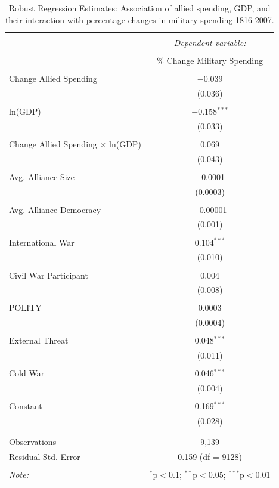 \documentclass[12pt]{article}
\begin{document}
\begin{table}[!htbp] \centering 
  \caption{} 
  \label{} 
\begin{tabular}{@{\extracolsep{5pt}}lc} 
\\[-1.8ex]\hline 
\hline \\[-1.8ex] 
 & \multicolumn{1}{c}{\textit{Dependent variable:}} \\ 
\cline{2-2} 
\\[-1.8ex] & \% Change Military Spending \\ 
\hline \\[-1.8ex] 
 Change Allied Spending & $-$0.039 \\ 
  & (0.036) \\ 
  & \\ 
 ln(GDP) & $-$0.158$^{***}$ \\ 
  & (0.033) \\ 
  & \\ 
 Change Allied Spending $\times$ ln(GDP) & 0.069 \\ 
  & (0.043) \\ 
  & \\ 
 Avg. Alliance Size & $-$0.0001 \\ 
  & (0.0003) \\ 
  & \\ 
 Avg. Alliance Democracy & $-$0.00001 \\ 
  & (0.001) \\ 
  & \\ 
 International War & 0.104$^{***}$ \\ 
  & (0.010) \\ 
  & \\ 
 Civil War Participant & 0.004 \\ 
  & (0.008) \\ 
  & \\ 
 POLITY & 0.0003 \\ 
  & (0.0004) \\ 
  & \\ 
 External Threat & 0.048$^{***}$ \\ 
  & (0.011) \\ 
  & \\ 
 Cold War & 0.046$^{***}$ \\ 
  & (0.004) \\ 
  & \\ 
 Constant & 0.169$^{***}$ \\ 
  & (0.028) \\ 
  & \\ 
\hline \\[-1.8ex] 
Observations & 9,139 \\ 
Residual Std. Error & 0.159 (df = 9128) \\ 
\hline 
\hline \\[-1.8ex] 
\textit{Note:}  & \multicolumn{1}{r}{$^{*}$p$<$0.1; $^{**}$p$<$0.05; $^{***}$p$<$0.01} \\ 
\end{tabular} 
\caption{Robust Regression Estimates: Association of allied spending, GDP, and their interaction with percentage changes in military spending 1816-2007.}
\label{tab:rreg-res}
\end{table}
\end{document}
